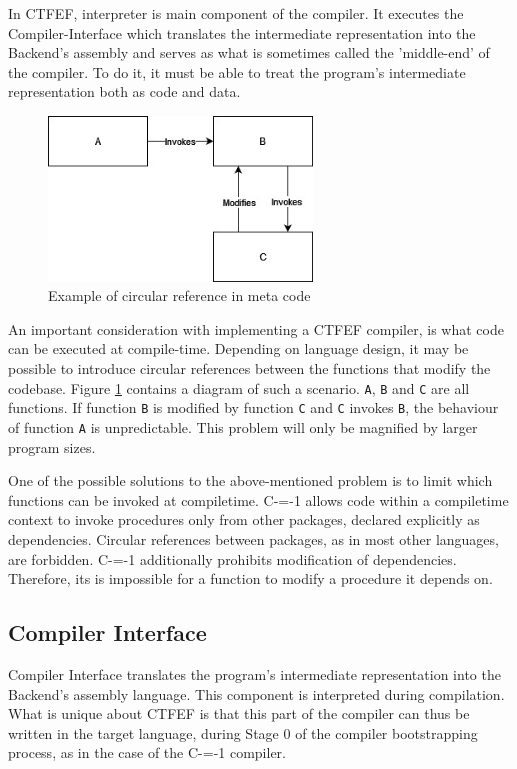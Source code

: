 In CTFEF, interpreter is main component of the compiler.
It executes the Compiler-Interface which translates the intermediate representation into the Backend's assembly and serves as what is sometimes called the 'middle-end' of the compiler\cite{hsu2021llvm}.
To do it, it must be able to treat the program's intermediate representation both as code and data.

\begin{figure}
	\includegraphics[width=7cm]{pictures/circular-function-reference.jpg}
	\caption{Example of circular reference in meta code}
	\label{circular-function-reference}
\end{figure}

An important consideration with implementing a CTFEF compiler, is what code can be executed at compile-time.
Depending on language design, it may be possible to introduce circular references between the functions that modify the codebase.
Figure \ref{circular-function-reference} contains a diagram of such a scenario.
\lstinline{A}, \lstinline{B} and \lstinline{C} are all functions.
If function \lstinline{B} is modified by function \lstinline{C} and \lstinline{C} invokes \lstinline{B}, the behaviour of function \lstinline{A} is unpredictable.
This problem will only be magnified by larger program sizes.


One of the possible solutions to the above-mentioned problem is to limit which functions can be invoked at compiletime.
C-=-1 allows code within a compiletime context to invoke procedures only from other packages, declared explicitly as dependencies.
Circular references between packages, as in most other languages, are forbidden.
C-=-1 additionally prohibits modification of dependencies.
Therefore, its is impossible for a function to modify a procedure it depends on.

\subsection{Compiler Interface}
\label{compiler-interface}

Compiler Interface translates the program's intermediate representation into the Backend's assembly language.
This component is interpreted during compilation.
What is unique about CTFEF is that this part of the compiler can thus be written in the target language, during Stage 0 of the compiler bootstrapping process, as in the case of the C-=-1 compiler\cite{puntambekar:compiler_design, novillo2007gcc, grabski2022compilation}.

